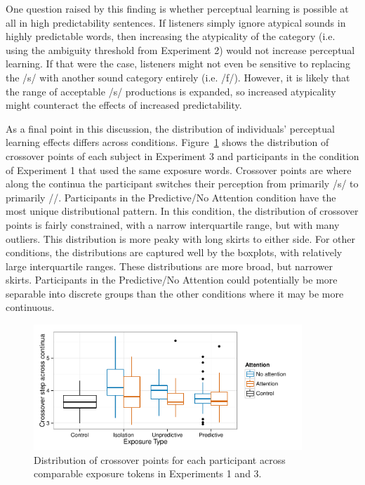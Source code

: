 One question raised by this finding is whether perceptual learning is possible at all in high predictability sentences.
If listeners simply ignore atypical sounds in highly predictable words, then increasing the atypicality of the category (i.e. using the ambiguity threshold from Experiment 2) would not increase perceptual learning.
If that were the case, listeners might not even be sensitive to replacing the /s/ with another sound category entirely (i.e. /f/).
However, it is likely that the range of acceptable /s/ productions is expanded, so increased atypicality might counteract the effects of increased predictability.

As a final point in this discussion, the distribution of individuals' perceptual learning effects differs across conditions. 
Figure~\ref{fig:exp13xoverdist} shows the distribution of crossover points of each subject in Experiment 3 and participants in the condition of Experiment 1 that used the same exposure words.  
Crossover points are where along the continua the participant switches their perception from primarily /s/ to primarily /\textesh/.
Participants in the Predictive/No Attention condition have the most unique distributional pattern.
In this condition, the distribution of crossover points is fairly constrained, with a narrow interquartile range, but with many outliers.
This distribution is more peaky with long skirts to either side.
For other conditions, the distributions are captured well by the boxplots, with relatively large interquartile ranges.
These distributions are more broad, but narrower skirts.
Participants in the Predictive/No Attention could potentially be more separable into discrete groups than the other conditions where it may be more continuous.


\begin{figure}[!ht]
\centering
\caption{Distribution of crossover points for each participant across comparable exposure tokens in Experiments 1 and 3.}
\label{fig:exp13xoverdist}
\begin{center}
\includegraphics[width=0.9\textwidth]{graphs/exp13_xoverdist}
\end{center}
\end{figure}

